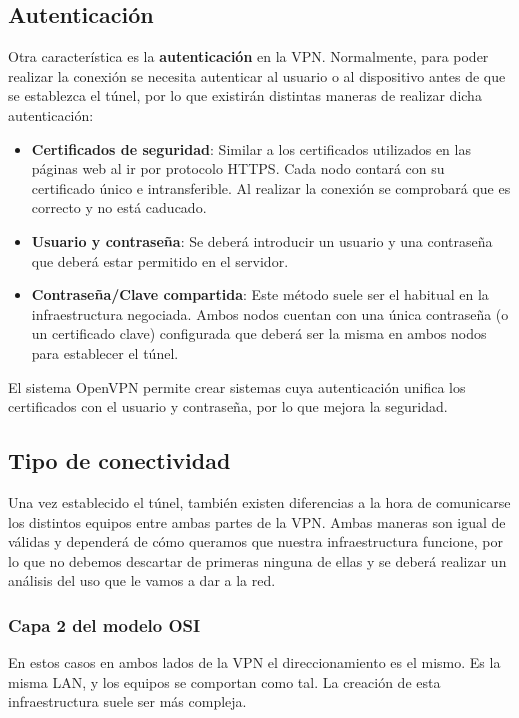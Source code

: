 \subsection{Autenticación}
Otra característica es la \textbf{autenticación} en la VPN. Normalmente, para poder realizar la conexión se necesita autenticar al usuario o al dispositivo antes de que se establezca el túnel, por lo que existirán distintas maneras de realizar dicha autenticación:

\begin{itemize}
    \item \textbf{Certificados de seguridad}: Similar a los certificados utilizados en las páginas web al ir por protocolo HTTPS. Cada nodo contará con su certificado único e intransferible. Al realizar la conexión se comprobará que es correcto y no está caducado.

    \item \textbf{Usuario y contraseña}: Se deberá introducir un usuario y una contraseña que deberá estar permitido en el servidor.

    \item \textbf{Contraseña/Clave compartida}: Este método suele ser el habitual en la infraestructura negociada. Ambos nodos cuentan con una única contraseña (o un certificado clave) configurada que deberá ser la misma en ambos nodos para establecer el túnel.
\end{itemize}


El sistema OpenVPN permite crear sistemas cuya autenticación unifica los certificados con el usuario y contraseña, por lo que mejora la seguridad.


\subsection{Tipo de conectividad}
Una vez establecido el túnel, también existen diferencias a la hora de comunicarse los distintos equipos entre ambas partes de la VPN. Ambas maneras son igual de válidas y dependerá de cómo queramos que nuestra infraestructura funcione, por lo que no debemos descartar de primeras ninguna de ellas y se deberá realizar un análisis del uso que le vamos a dar a la red.


\subsubsection{Capa 2 del modelo OSI}
En estos casos en ambos lados de la VPN el direccionamiento es el mismo. Es la misma LAN, y los equipos se comportan como tal. La creación de esta infraestructura suele ser más compleja.

